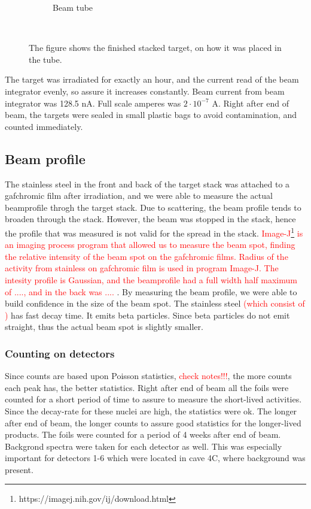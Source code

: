 \documentclass[a4paper,11pt,twoside]{book}
\begin{document}
\begin{figure}
\begin{subfigure}[b]{0.3\textwidth}
        \caption{Beam tube}
        \label{fig:tube}
    \end{subfigure}
    ~ %
    \caption{The figure shows the finished stacked target, on how it was placed in the tube. }\label{fig:finished_stack}
\end{figure}
\noindent
The target was irradiated for exactly an hour, and the current read of the beam integrator evenly, so assure it increases constantly. Beam current from beam integrator was 128.5 nA. Full scale amperes was $2\cdot 10^{-7} $ A. Right after end of beam, the targets were sealed in small plastic bags to avoid contamination, and counted immediately. 


\subsection{Beam profile}
The stainless steel in the front and back of the target stack was attached to a gafchromic film after irradiation, and we were able to measure the actual beamprofile throgh the target stack. Due to scattering, the beam profile tends to broaden through the stack. However, the beam was stopped in the stack, hence the profile that was measured is not valid for the spread in the stack. \textcolor{red}{Image-J\footnote{https://imagej.nih.gov/ij/download.html} is an imaging process program that allowed us to measure the beam spot, finding the relative intensity of the beam spot on the gafchromic films. Radius of the activity from stainless on gafchromic film is used in program Image-J. The intesity profile is Gaussian, and the beamprofile had a full width half maximum of ...., and in the back was .... }. By measuring the beam profile, we were able to build confidence in the size of the beam spot. The stainless steel \textcolor{red}{(which consist of )} has fast decay time. It emits beta particles. Since beta particles do not emit straight, thus the actual beam spot is slightly smaller.   

\subsubsection{Counting on detectors}
Since counts are based upon Poisson statistics, \textcolor{red}{check notes!!!}, the more counts each peak has, the better statistics. Right after end of beam all the foils were counted for a short period of time to assure to measure the short-lived activities. Since the decay-rate for these nuclei are high, the statistics were ok. The longer after end of beam, the longer counts to assure good statistics for the longer-lived products. The foils were counted for a period of 4 weeks after end of beam. Backgrond spectra were taken for each detector as well. This was especially important for detectors 1-6 which were located in cave 4C, where background was present. 
\end{document}
